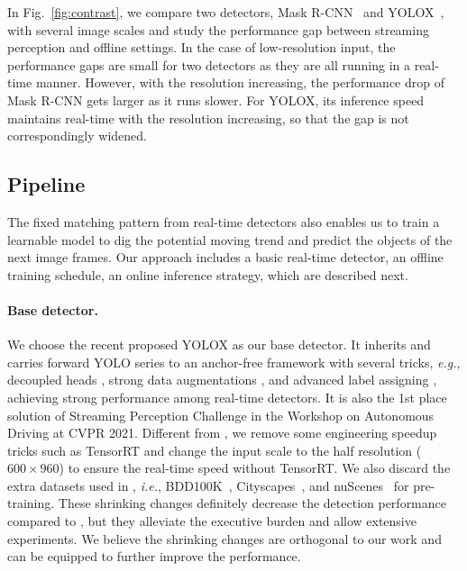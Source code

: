 \documentclass[10pt,twocolumn,letterpaper]{article}
\begin{document}
In Fig.~\ref{fig:contrast}, we compare two detectors, Mask R-CNN~\cite{maskrcnn} and YOLOX~\cite{yolox}, with several image scales and study the performance gap between streaming perception and offline settings. In the case of low-resolution input, the performance gaps are small for two detectors as they are all running in a real-time manner. However, with the resolution increasing, the performance drop of Mask R-CNN gets larger as it runs slower. For YOLOX, its inference speed maintains real-time with the resolution increasing, so that the gap is not correspondingly widened.     

\subsection{Pipeline}
\label{sec:3.2}

The fixed matching pattern from real-time detectors also enables us to train a learnable model to dig the potential moving trend and predict the objects of the next image frames. Our approach includes a basic real-time detector, an offline training schedule, an online inference strategy, which are described next.    

\paragraph{Base detector.} We choose the recent proposed YOLOX \cite{yolox} as our base detector. It inherits and carries forward YOLO series  \cite{yolo1,yolo2,yolo3} to an anchor-free framework with several tricks, \emph{e.g.}, decoupled heads \cite{head1,head2}, strong data augmentations \cite{mixup,copypaste}, and advanced label assigning \cite{ota},  achieving strong performance among real-time detectors.
It is also the 1st place solution \cite{yoloxx} of Streaming Perception Challenge in the Workshop on Autonomous Driving at CVPR 2021. Different from \cite{yoloxx}, we remove some engineering speedup tricks such as TensorRT and change the input scale to the half resolution ($600 \times 960$) to ensure the real-time speed without TensorRT. We also discard the extra datasets used in \cite{yoloxx}, \emph{i.e.}, BDD100K~\cite{yu2020bdd100k}, Cityscapes~\cite{cordts2016cityscapes}, and nuScenes~\cite{caesar2020nuscenes} for pre-training. These shrinking changes definitely decrease the detection performance compared to \cite{yoloxx}, but they alleviate the executive burden and allow extensive experiments. We believe the shrinking changes are orthogonal to our work and can be equipped to further improve the performance.       
\end{document}
